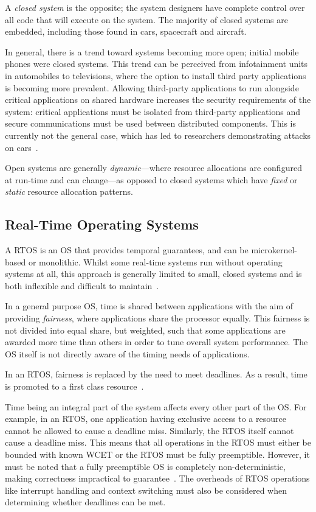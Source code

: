 A \emph{closed system} is the opposite; the system designers have complete control over all code
that will execute on the system.  The majority of closed systems are embedded, including those found
in cars, spacecraft and aircraft.

In general, there is a trend toward systems becoming more open; initial mobile phones were closed
systems.  This trend can be perceived from infotainment units in automobiles to televisions, where
the option to install third party applications is becoming more prevalent.  Allowing third-party
applications to run alongside critical applications on shared hardware increases the security
requirements of the system: critical applications must be isolated from third-party applications and
secure communications must be used between distributed components.  This is currently not the
general case, which has led to researchers demonstrating attacks on
cars~\citep{Checkoway_MKASSKCRK_11}.

Open systems are generally \emph{dynamic}---where resource allocations are configured at run-time
and can change---as opposed to closed systems which have \emph{fixed} or \emph{static} resource
allocation patterns.

\subsection{Real-Time Operating Systems}

A \gls{RTOS} is an \gls{OS} that provides temporal guarantees, and can be microkernel-based or
monolithic.  Whilst some real-time systems run without operating systems at all, this approach is
generally limited to small, closed systems and is both inflexible and difficult to
maintain~\citep{Lui_AACBBBCLM_04}.

In a general purpose \gls{OS}, time is shared between applications with the aim of providing
\emph{fairness}, where applications share the processor equally.  This fairness is not divided into
equal share, but weighted, such that some applications are awarded more time than others in order
to tune overall system performance.  The \gls{OS} itself is not directly aware of the timing needs of
applications.

In an \gls{RTOS}, fairness is replaced by the need to meet deadlines. As a result, time is promoted
to a first class resource~\citep{Stankovic_88}.

Time being an integral part of the system affects every other part of the \gls{OS}.  For example, in
an \gls{RTOS}, one application having exclusive access to a resource cannot be allowed to cause a
deadline miss.  Similarly, the \gls{RTOS} itself cannot cause a deadline miss.  This means that all
operations in the \gls{RTOS} must either be bounded with known {\gls{WCET}} or the \gls{RTOS} must
be fully preemptible.  However, it must be noted that a fully preemptible \gls{OS} is completely
non-deterministic, making correctness impractical to guarantee~\citep{Blackham_TH_12}.  The overheads
of \gls{RTOS} operations like interrupt handling and context switching must also be considered when
determining whether deadlines can be met.


